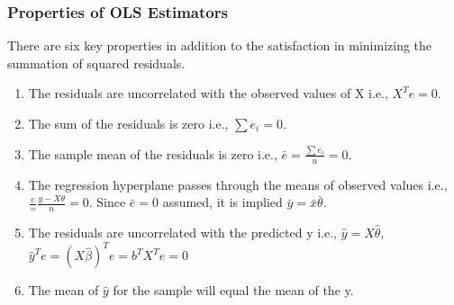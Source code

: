 \documentclass[12pt]{article}
\begin{document}
\subsubsection{Properties of OLS Estimators}
There are six key properties in addition to the satisfaction in minimizing the summation of squared residuals.
\begin{enumerate}
	\item The residuals are uncorrelated with the observed values of X i.e., $X^{T}e=0$.
	\item The sum of the residuals is zero i.e., $\sum e_i=0$.
	\item The sample mean of the residuals is zero i.e., $\bar{e} = \frac{\sum e_i}{n} = 0$.
	\item The regression hyperplane passes through the means of observed values i.e., $\frac{e} = \frac{y - X\theta}{n} = 0$. Since $\bar{e} = 0$ assumed, it is implied $\bar{y}=\bar{x}\bar{\theta}$.
	\item The residuals are uncorrelated with the predicted y i.e., $\hat{y} = X\hat{\theta}$, $\hat{y}^{T}e = (X\hat{\beta})^{T}e = b^{T}X^{T}e = 0$ 
	\item The mean of $\hat{y}$ for the sample will equal the mean of the y.
\end{enumerate}
\end{document}
